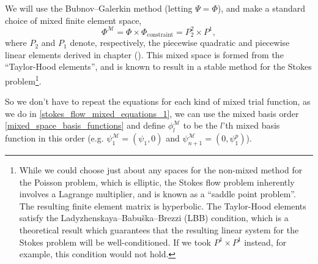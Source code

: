 We will use the Bubnov--Galerkin method (letting $\Psi = \Phi$), and make a standard choice of mixed finite element space,
    $$\Phi^\mathcal{M} = \Phi \times \Phi_{\text{constraint}} = P^2_2 \times P^1,$$
where $P_2$ and $P_1$ denote, respectively, the piecewise quadratic and piecewise linear elements derived in chapter ().
This mixed space is formed from the ``Taylor-Hood elements'', and is known to result in a stable method for the Stokes problem\footnote{
While we could choose just about any spaces for the non-mixed method for the Poisson problem, which is elliptic, the Stokes flow problem
inherently involves a Lagrange multiplier, and is known as a ``saddle point problem''. The resulting finite element matrix is hyperbolic.
The Taylor-Hood elements satisfy the Ladyzhenskaya--Babu\v ska--Brezzi (LBB) condition, which
is a theoretical result which guarantees that the resulting linear system for the Stokes problem will be well-conditioned.
If we took $P^1 \times P^1$ instead, for example, this condition would not hold.
}.

So we don't have to repeat the equations for each kind of mixed trial function, as we do in \eqref{stokes_flow_mixed_equations_1}, we can use the mixed basis order \eqref{mixed_space_basis_functions} and define $\phi^\mathcal{M}_l$ to be the $l$'th mixed basis
function in this order (e.g. $\psi^\mathcal{M}_1 = (\psi_1, 0)$ and $\psi^\mathcal{M}_{n+1} = (0, \psi^p_1)$).


